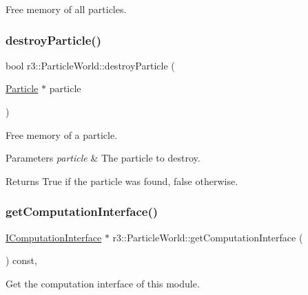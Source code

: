Free memory of all particles. 

\mbox{\label{classr3_1_1_particle_world_a1802231868ed6d99dd677ef71328781a}} 
\subsubsection{\texorpdfstring{destroy\+Particle()}{destroyParticle()}}
{\footnotesize\ttfamily bool r3\+::\+Particle\+World\+::destroy\+Particle (\begin{DoxyParamCaption}\item[{\mbox{\hyperlink{classr3_1_1_particle}{Particle}} $\ast$}]{particle }\end{DoxyParamCaption})}



Free memory of a particle. 


\begin{DoxyParams}{Parameters}
{\em particle} & The particle to destroy. \\
\hline
\end{DoxyParams}
\begin{DoxyReturn}{Returns}
True if the particle was found, false otherwise. 
\end{DoxyReturn}
\mbox{\label{classr3_1_1_particle_world_a1e806bf89ec6445a54b9534f1efc081f}} 
\subsubsection{\texorpdfstring{get\+Computation\+Interface()}{getComputationInterface()}}
{\footnotesize\ttfamily \mbox{\hyperlink{classr3_1_1_i_computation_interface}{I\+Computation\+Interface}} $\ast$ r3\+::\+Particle\+World\+::get\+Computation\+Interface (\begin{DoxyParamCaption}{ }\end{DoxyParamCaption}) const\hspace{0.3cm}{\ttfamily [override]}, {\ttfamily [virtual]}}

Get the computation interface of this module. 

